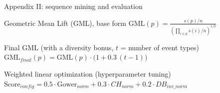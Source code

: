 \documentclass[aspectratio=169,11pt]{beamer}
\begin{document}
\begin{frame}{Appendix II: sequence mining and evaluation}
  \small
  \begin{block}{Geometric Mean Lift (GML), base form}
    \centering
    $\displaystyle \mathrm{GML}(p)=\frac{s(p)/n}{\left(\prod_{i\in p}s(i)/n\right)^{1/k}}$
  \end{block}
  \begin{block}{Final GML (with a diversity bonus, $t$ = number of event types)}
    \centering
    $\displaystyle \mathrm{GML}_{final}(p)=\mathrm{GML}(p)\cdot\bigl(1+0.3\,(t-1)\bigr)$
  \end{block}
  \begin{block}{Weighted linear optimization (hyperparameter tuning)}
    \centering
    $\displaystyle \text{Score}_{config}=0.5\cdot\text{Gower}_{norm}+0.3\cdot CH_{norm}+0.2\cdot DB_{inv\_norm}$
  \end{block}
\end{frame}
\end{document}

